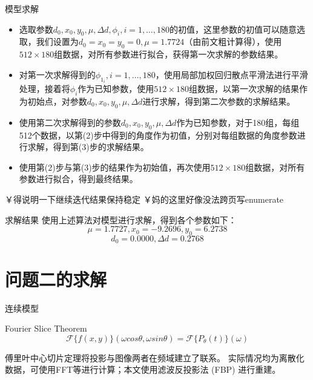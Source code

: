 \documentclass{beamer}
\begin{document}
  \begin{frame}{模型求解}
    \begin{itemize}
      \item 选取参数\(d_0,x_0,y_0,\mu,\Delta d,\phi_i,i=1,\ldots,180\)的初值，这里参数的初值可以随意选取，我们设置为\(d_0 = x_0 = y_0 =  0,\mu = 1.7724\)（由前文粗计算得），使用\(512\times 180\)组数据，对所有参数进行拟合，获得第一次求解的参数结果。
      \item 对第一次求解得到的\(\phi_{1_i},i=1,\ldots,180\)，使用局部加权回归散点平滑法进行平滑处理，接着将\(\phi_i\)作为已知参数，使用\(512\times 180\)组数据，以第一次求解的结果作为初始点，对参数\(d_0,x_0,y_0,\mu,\Delta d\)进行求解，得到第二次参数的求解结果。
    \end{itemize}
    \end{frame}

    \begin{frame}
    \begin{itemize}
      \item 使用第二次求解得到的参数\(d_0,x_0,y_0,\mu,\Delta d\)作为已知参数，对于180组，每组512个数据，以第(2)步中得到的角度作为初值，分别对每组数据的角度参数进行求解，得到第(3)步的求解结果。
      \item 使用第(2)步与第(3)步的结果作为初始值，再次使用\(512\times 180\)组数据，对所有参数进行拟合，得到最终结果。
      \end{itemize}
      ￥得说明一下继续迭代结果保持稳定
      ￥妈的这里好像没法跨页写enumerate
  \end{frame}

  \begin{frame}{求解结果} 
    使用上述算法对模型进行求解，得到各个参数如下：
    \[\mu = 1.7727,x_0 = -9.2696,y_0 = 6.2738\]
    \[d_0 = 0.0000,\Delta d = 0.2768\]
  \end{frame}
  
\section{问题二的求解}

\begin{frame}{连续模型}
	\begin{theorem}{Fourier Slice Theorem}
		\begin{equation}
		\mathcal{F}\{f(x,y)\}(\omega cos\theta,\omega sin\theta)=\mathcal{F}\{P_\theta(t)\}(\omega)
		\end{equation}
	\end{theorem}
	傅里叶中心切片定理将投影与图像两者在频域建立了联系。
	实际情况均为离散化数据，可使用FFT等进行计算；本文使用滤波反投影法 (FBP) 进行重建。
\end{frame}
\end{document}
